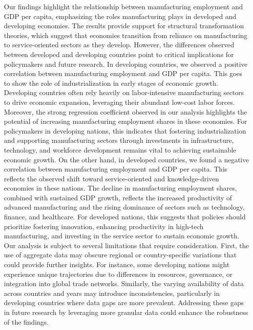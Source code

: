 \documentclass[12pt]{article}
\begin{document}
    Our findings highlight the relationship between manufacturing employment and GDP per capita, emphasizing the roles manufacturing plays in developed and developing economies. The results provide support for structural transformation theories, which suggest that economies transition from reliance on manufacturing to service-oriented sectors as they develop. However, the differences observed between developed and developing countries point to critical implications for policymakers and future research.
    In developing countries, we observed a positive correlation between manufacturing employment and GDP per capita. This goes to show the role of industrialization in early stages of economic growth. Developing countries often rely heavily on labor-intensive manufacturing sectors to drive economic expansion, leveraging their abundant low-cost labor forces. Moreover, the strong regression coefficient observed in our analysis highlights the potential of increasing manufacturing employment shares in these economies. For policymakers in developing nations, this indicates that fostering industrialization and supporting manufacturing sectors through investments in infrastructure, technology, and workforce development remains vital to achieving sustainable economic growth. On the other hand, in developed countries, we found a negative correlation between manufacturing employment and GDP per capita. This reflects the observed shift toward service-oriented and knowledge-driven economies in these nations. The decline in manufacturing employment shares, combined with sustained GDP growth, reflects the increased productivity of advanced manufacturing and the rising dominance of sectors such as technology, finance, and healthcare. For developed nations, this suggests that policies should prioritize fostering innovation, enhancing productivity in high-tech manufacturing, and investing in the service sector to sustain economic growth. 
    Our analysis is subject to several limitations that require consideration. First, the use of aggregate data may obscure regional or country-specific variations that could provide further insights. For instance, some developing nations might experience unique trajectories due to differences in resources, governance, or integration into global trade networks. Similarly, the varying availability of data across countries and years may introduce inconsistencies, particularly in developing countries where data gaps are more prevalent. Addressing these gaps in future research by leveraging more granular data could enhance the robustness of the findings.
\end{document}
